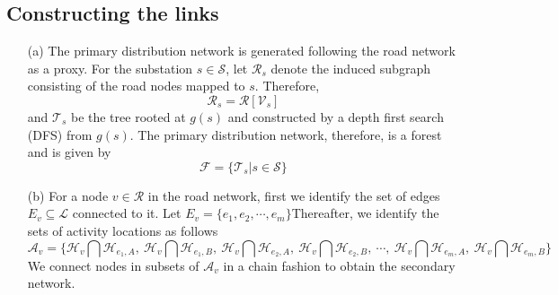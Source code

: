\subsection{Constructing the links}\label{subsec:link}
\begin{enumerate}
	\item[(a)] The primary distribution network is generated following the road network as a proxy. For the substation $s\in\mathcal{S}$, let $\mathcal{R}_s$ denote the induced subgraph consisting of the road nodes mapped to $s$. Therefore,
	\begin{equation}\mathcal{R}_s=\mathcal{R}[\mathcal{V}_s]\end{equation}
	and $\mathcal{T}_s$ be the tree rooted at $g(s)$ and constructed by a depth first search (DFS) from $g(s)$. The primary distribution network, therefore, is a forest and is given by
	\begin{equation}\mathcal{F}=\{\mathcal{T}_s|s\in\mathcal{S}\}\end{equation}
	
	\item[(b)] For a node $v\in\mathcal{R}$ in the road network, first we identify the set of edges $E_v\subseteq\mathcal{L}$ connected to it. Let $E_v=\{e_1,e_2,\cdots,e_m\}$Thereafter, we identify the sets of activity locations as follows
	\begin{equation}
	\mathcal{A}_v=\bigg\{\mathcal{H}_v\bigcap\mathcal{H}_{e_1,A},\ \mathcal{H}_v\bigcap\mathcal{H}_{e_1,B},\ \mathcal{H}_v\bigcap\mathcal{H}_{e_2,A},\ \mathcal{H}_v\bigcap\mathcal{H}_{e_2,B},\ \cdots,\  \mathcal{H}_v\bigcap\mathcal{H}_{e_m,A},\ \mathcal{H}_v\bigcap\mathcal{H}_{e_m,B} \bigg\}
	\end{equation}
	We connect nodes in subsets of $\mathcal{A}_v$ in a chain fashion to obtain the secondary network.
\end{enumerate}